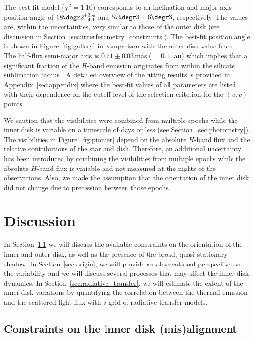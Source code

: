 \documentclass[twocolumn,tighten]{aastex61}
\newcommand{\ffdeg}{\mbox{\ensuremath{.\!\!\degr}}}
\begin{document}
The best-fit model ($\chi^2=1.10$) corresponds to an inclination and major axis position angle of $18\ffdeg2^{+3.4}_{-4.1}$ and $57\ffdeg3 \pm 6\ffdeg3$, respectively. The values are, within the uncertainties, very similar to those of the outer disk (see discussion in Section~\ref{sec:interferometry_constraints}). The best-fit position angle is shown in Figure~\ref{fig:gallery} in comparison with the outer disk value from \citet{vandermarel2015}. The half-flux semi-major axis is $0.71 \pm 0.03$\,mas ($=0.11$\,au) which implies that a significant fraction of the $H$-band emission originates from within the silicate sublimation radius \citep[$R_{\rm sub}=0.2$\,au;][]{carmona2014}. A detailed overview of the fitting results is provided in Appendix~\ref{sec:appendix} where the best-fit values of all parameters are listed with their dependence on the cutoff level of the selection criterion for the $(u,v)$ points.

We caution that the visibilities were combined from multiple epochs while the inner disk is variable on a timescale of days or less (see Section~\ref{sec:photometry}). The visibilities in Figure~\ref{fig:pionier} depend on the absolute $H$-band flux and the relative contributions of the star and disk. Therefore, an additional uncertainty has been introduced by combining the visibilities from multiple epochs while the absolute $H$-band flux is variable and not measured at the nights of the observations. Also, we made the assumption that the orientation of the inner disk did not change due to precession between those epochs.

\section{Discussion}\label{sec:discussion}

In Section~\ref{sec:misalignment} we will discuss the available constraints on the orientation of the inner and outer disk, as well as the presence of the broad, quasi-stationary shadow. In Section~\ref{sec:origin}, we will provide an observational perspective on the variability and we will discuss several processes that may affect the inner disk dynamics. In Section~\ref{sec:radiative_transfer}, we will estimate the extent of the inner disk variations by quantifying the correlation between the thermal emission and the scattered light flux with a grid of radiative transfer models.

\subsection{Constraints on the inner disk (mis)alignment}\label{sec:misalignment}
\end{document}
